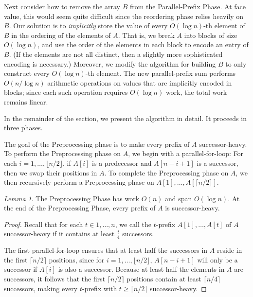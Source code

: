 \documentclass[sigplan, 10pt, nonacm]{acmart}
\renewcommand{\paragraph}[1]{\vspace{0.09in}\noindent{\bf \boldmath #1.}}
\theoremstyle{remark}
\newtheorem{lemma}[thm]{Lemma}
\theoremstyle{remark}
\begin{document}
\begin{appendices}
Next consider how to remove the array $B$ from the Parallel-Prefix
Phase. At face value, this would seem quite difficult since the
reordering phase relies heavily on $B$. Our solution is to
\emph{implicitly} store the value of every $O(\log n)$-th element of
$B$ in the ordering of the elements of $A$. That is, we break $A$ into
blocks of size $O(\log n)$, and use the order of the elements in each
block to encode an entry of $B$. (If the elements are not all
  distinct, then a slightly more sophisticated encoding is necessary.)
Moreover, we modify the algorithm for building $B$ to only construct
every $O(\log n)$-th element. The new parallel-prefix sum performs
$O(n / \log n)$ arithmetic operations on values that are implicitly
encoded in blocks; since each such operation requires $O(\log n)$
work, the total work remains linear.

In the remainder of the section, we present the algorithm in detail.
It proceeds in three phases.

\paragraph{A Preprocessing Phase}
The goal of the Preprocessing phase is to make every prefix of $A$
successor-heavy. To perform the Preprocessing phase on $A$, we begin
with a parallel-for-loop: For each $i = 1, \ldots, \lfloor n /
2\rfloor$, if $A[i]$ is a predecessor and $A[n - i + 1]$ is a
successor, then we swap their positions in $A$. To complete the
Preprocessing phase on $A$, we then recursively perform a
Preprocessing phase on $A[1], \ldots, A[\lceil n / 2 \rceil]$.

\begin{lemma}
 The Preprocessing Phase has work $O(n)$ and span $O(\log n)$. At the
 end of the Preprocessing Phase, every prefix of $A$ is
 successor-heavy.
  \label{lem:preprocessingphase}
\end{lemma}
\begin{proof}
Recall that for each $t \in 1, \ldots, n$, we call the $t$-prefix
$A[1], \ldots, A[t]$ of $A$ successor-heavy if it contains at least
$\frac{t}{4}$ successors.

The first parallel-for-loop ensures that at least half the successors
in $A$ reside in the first $\lceil n / 2 \rceil$ positions, since for
$i = 1, \ldots, \lfloor n / 2 \rfloor$, $A[n - i + 1]$ will only be a
successor if $A[i]$ is also a successor. Because at least half the
elements in $A$ are successors, it follows that the first $\lceil n /
2 \rceil$ positions contain at least $\lceil n / 4\rceil$ successors,
making every $t$-prefix with $t \ge \lceil n / 2 \rceil$
successor-heavy.


\end{proof}
\end{appendices}
\end{document}

